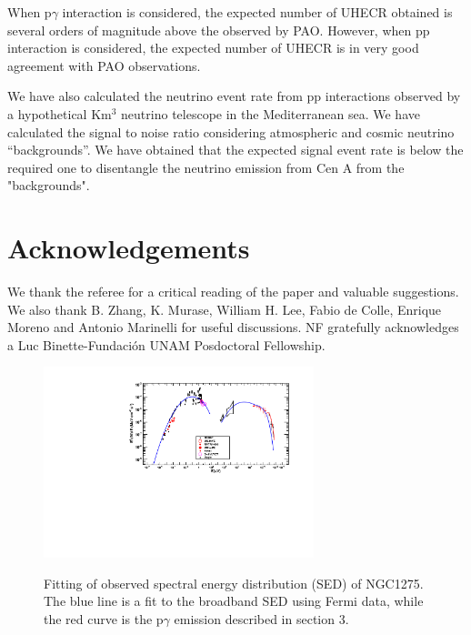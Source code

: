 \documentclass[useAMS,usenatbib,a4]{mn2e}
\begin{document}
When p$\gamma$ interaction is considered, the expected number of UHECR obtained is several orders of magnitude above the observed by PAO. However, when pp interaction is considered, the expected number of UHECR is in very good agreement with PAO observations. 

We have also calculated the neutrino event rate from pp interactions observed by a hypothetical Km$^{3}$ neutrino telescope in the Mediterranean sea. We have calculated the signal to noise ratio considering atmospheric and cosmic neutrino ``backgrounds''. We have obtained that the expected signal event rate is below the required one to disentangle the neutrino emission from Cen A from the "backgrounds".




\section*{Acknowledgements}

We thank the referee  for a critical reading of the paper and valuable suggestions. We also thank B. Zhang, K. Murase, William H. Lee, Fabio de Colle, Enrique Moreno and Antonio Marinelli for useful discussions.   NF gratefully acknowledges a Luc Binette-Fundaci\'on UNAM Posdoctoral Fellowship.
 
 











\clearpage
\begin{figure}[h!]
 \centering
  \includegraphics[width=0.7\textwidth]{NGC1275pgamma.pdf}\\
  \caption{Fitting of observed spectral energy distribution (SED) of NGC1275.  The blue line is a fit to the broadband SED using Fermi data, while the red curve is the p$\gamma$ emission described in section 3.}\label{SEDpgama}
\end{figure} 
\end{document}
